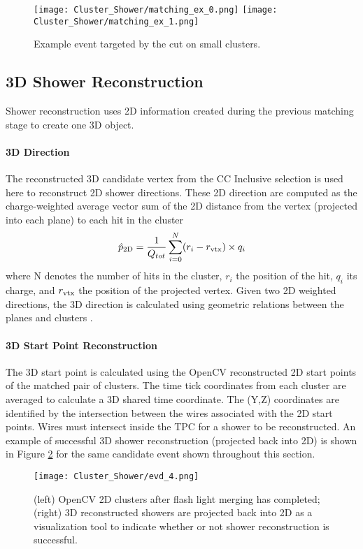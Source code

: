 \begin{figure}[H]
\centering
\texttt{[image: Cluster\_Shower/matching\_ex\_0.png]}
\texttt{[image: Cluster\_Shower/matching\_ex\_1.png]}
\caption{Example event targeted by the cut on small clusters.}
\label{fig:matching_ex_0}
\end{figure}


\subsection{3D Shower Reconstruction}
Shower reconstruction uses 2D information created during the previous matching stage to create one 3D object. 
\paragraph{3D Direction}  The reconstructed 3D candidate vertex from the CC Inclusive selection is used here to reconstruct 2D shower directions. These 2D direction are computed as the charge-weighted average vector sum of the 2D distance from the vertex (projected into each plane) to each hit in the cluster
\begin{equation}
  \hat{p}_{\rm 2D} = \frac{1}{Q_{tot}} \sum_{i=0}^{N} (r_i - r_{\rm vtx}) \times q_i 
\end{equation}
where N denotes the number of hits in the cluster, $r_i$ the position of the hit, $q_i$ its charge, and $r_{\rm vtx}$ the position of the projected vertex. Given two 2D weighted directions, the 3D direction is calculated using geometric relations between the planes and clusters \cite{bib:larliteGeoHelper}. 

\paragraph{3D Start Point Reconstruction} The 3D start point is calculated using the OpenCV reconstructed 2D start points of the matched pair of clusters. The time tick coordinates from each cluster are averaged to calculate a 3D shared time coordinate. The (Y,Z) coordinates are identified by the intersection between the wires associated with the 2D start points.  Wires must intersect inside the TPC for a shower to be reconstructed.  An example of successful 3D shower reconstruction (projected back into 2D) is shown in Figure \ref{fig:showers} for the same candidate event shown throughout this section.

\begin{figure}[H] %
\centering
\texttt{[image: Cluster\_Shower/evd\_4.png]}
\caption{(left) OpenCV 2D clusters after flash light merging has completed; (right) 3D reconstructed showers are projected back into 2D as a visualization tool to indicate whether or not shower reconstruction is successful. }
\label{fig:showers}
\end{figure}

